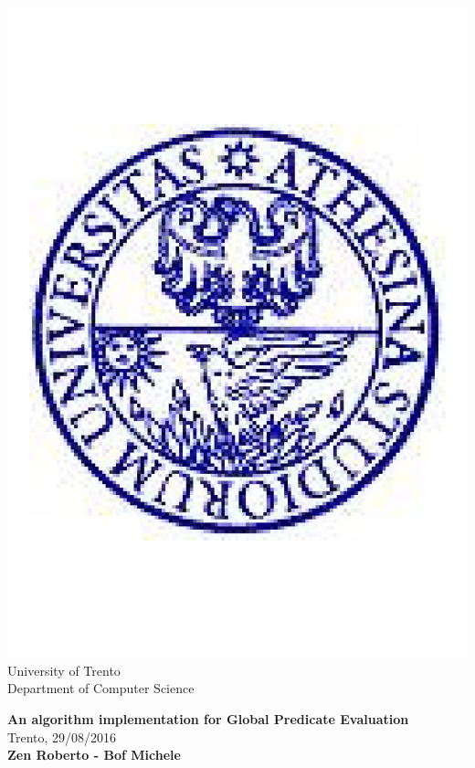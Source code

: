 \begin{titlepage}
\thispagestyle{plain}

\begin{center}
	\includegraphics[scale=0.12]{unitnlogo}	\\
	University of Trento	\\
	\small {Department of Computer Science}	\\[1cm]
\end{center}

{\centering
\textbf{\Huge An algorithm implementation for Global Predicate Evaluation}\\[1cm]
\small{Trento, 29/08/2016}	\\[1cm]
\textbf{Zen Roberto - Bof Michele}

}
\vfill


\end{titlepage}
